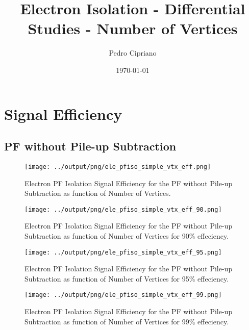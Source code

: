 \documentclass[11pt]{book}
\begin{document}
         
 
 \author{Pedro Cipriano}
 \date{\today}
 \title{Electron Isolation - Differential Studies - Number of Vertices}

\maketitle

\tableofcontents

\chapter{Signal Efficiency}
\section{PF without Pile-up Subtraction}
\begin{figure}[htb]
\centering
\texttt{[image: ../output/png/ele\_pfiso\_simple\_vtx\_eff.png]}
\caption{Electron PF Isolation Signal Efficiency for the PF without Pile-up Subtraction as function of Number of Vertices.}
\label{fig:ele_pfiso_vtx_eff_simple}
\end{figure}

\begin{figure}[htb]
\centering
\texttt{[image: ../output/png/ele\_pfiso\_simple\_vtx\_eff\_90.png]}
\caption{Electron PF Isolation Signal Efficiency for the PF without Pile-up Subtraction as function of Number of Vertices for 90\% effeciency.}
\label{fig:ele_pfiso_vtx_eff_simple_eff_90}
\end{figure}

\begin{figure}[htb]
\centering
\texttt{[image: ../output/png/ele\_pfiso\_simple\_vtx\_eff\_95.png]}
\caption{Electron PF Isolation Signal Efficiency for the PF without Pile-up Subtraction as function of Number of Vertices for 95\% effeciency.}
\label{fig:ele_pfiso_vtx_eff_simple_eff_95}
\end{figure}

\begin{figure}[htb]
\centering
\texttt{[image: ../output/png/ele\_pfiso\_simple\_vtx\_eff\_99.png]}
\caption{Electron PF Isolation Signal Efficiency for the PF without Pile-up Subtraction as function of Number of Vertices for 99\% effeciency.}
\label{fig:ele_pfiso_vtx_eff_simple_eff_99}
\end{figure}
\end{document}
